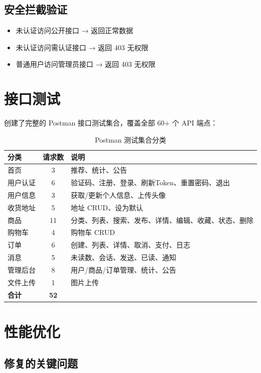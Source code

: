 \documentclass[12pt,a4paper,UTF8]{ctexart}
\begin{document}
\subsection{安全拦截验证}

\begin{itemize}
    \item 未认证访问公开接口 → 返回正常数据
    \item 未认证访问需认证接口 → 返回 403 无权限
    \item 普通用户访问管理员接口 → 返回 403 无权限
\end{itemize}

\section{接口测试}

创建了完整的 Postman 接口测试集合，覆盖全部 60+ 个 API 端点：

\begin{table}[H]
\centering
\caption{Postman 测试集合分类}
\begin{tabularx}{\textwidth}{lcX}
\toprule
\textbf{分类} & \textbf{请求数} & \textbf{说明} \\
\midrule
首页 & 3 & 推荐、统计、公告 \\
用户认证 & 6 & 验证码、注册、登录、刷新Token、重置密码、退出 \\
用户信息 & 3 & 获取/更新个人信息、上传头像 \\
收货地址 & 5 & 地址 CRUD、设为默认 \\
商品 & 11 & 分类、列表、搜索、发布、详情、编辑、收藏、状态、删除 \\
购物车 & 4 & 购物车 CRUD \\
订单 & 6 & 创建、列表、详情、取消、支付、日志 \\
消息 & 5 & 未读数、会话、发送、已读、通知 \\
管理后台 & 8 & 用户/商品/订单管理、统计、公告 \\
文件上传 & 1 & 图片上传 \\
\midrule
\textbf{合计} & \textbf{52} & \\
\bottomrule
\end{tabularx}
\end{table}

\section{性能优化}

\subsection{修复的关键问题}
\end{document}

